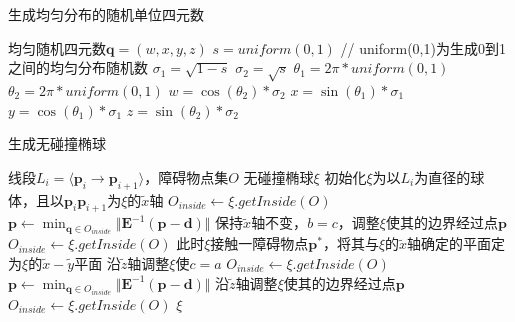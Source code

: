 \documentclass[11pt]{ctexart}
\begin{document}
  
    \begin{algorithm}[H]
		\renewcommand{\thealgorithm}{2-1}
        \caption{生成均匀分布的随机单位四元数}  
        \begin{algorithmic}[1] %
            \Ensure 均匀随机四元数$\mathbf{q}=(w,x,y,z)$
            \STATE $s=uniform(0,1)$ // uniform(0,1)为生成0到1之间的均匀分布随机数
            \STATE $\sigma_{1}=\sqrt{1-s}$
			\STATE $\sigma_{2}=\sqrt{s}$
			\STATE $\theta_{1}=2\pi*uniform(0,1)$
			\STATE $\theta_{2}=2\pi*uniform(0,1)$
			\STATE $w=\cos(\theta_{2})*\sigma_{2}$
			\STATE $x=\sin(\theta_{1})*\sigma_{1}$
			\STATE $y=\cos(\theta_{1})*\sigma_{1}$
			\STATE $z=\sin(\theta_{2})*\sigma_{2}$
			\STATE {}
        \end{algorithmic}  
    \end{algorithm} 

	  \begin{algorithm}[H]
		\renewcommand{\thealgorithm}{2-2}
        \caption{生成无碰撞椭球}  
        \begin{algorithmic}[1] %
            \Require 线段$L_{i}= \langle \mathbf{p}_{i} \rightarrow \mathbf{p}_{i+1} \rangle $，障碍物点集$O$
            \Ensure 无碰撞椭球$\xi$
            \STATE 初始化$\xi$为以$L_{i}$为直径的球体，且以$\mathbf{p}_{i}\mathbf{p}_{i+1}$为$\xi$的$\widetilde{x}$轴
			\STATE  $O_{inside}\gets \xi.getInside(O)$
				\STATE $\mathbf{p}\gets \min_{\mathbf{q} \in O_{inside}}\Vert \mathbf{E}^{-1}(\mathbf{p}-\mathbf{d}) \Vert$
				\STATE 保持$\widetilde{x}$轴不变，$b=c$，调整$\xi$使其的边界经过点$\mathbf{p}$
				\STATE $O_{inside}\gets \xi.getInside(O)$
			\EndWhile
			\STATE 此时$\xi$接触一障碍物点$\mathbf{p}^{*}$，将其与$\xi$的$\widetilde{x}$轴确定的平面定为$\xi$的$\widetilde{x}-\widetilde{y}$平面
			\STATE 沿$\widetilde{z}$轴调整$\xi$使$c=a$
			\STATE  $O_{inside}\gets \xi.getInside(O)$
				\STATE $\mathbf{p}\gets \min_{\mathbf{q} \in O_{inside}}\Vert \mathbf{E}^{-1}(\mathbf{p}-\mathbf{d}) \Vert$
				\STATE 沿$\widetilde{z}$轴调整$\xi$使其的边界经过点$\mathbf{p}$
				\STATE $O_{inside}\gets \xi.getInside(O)$
			\EndWhile
			\STATE \Return $\xi$
        \end{algorithmic}  
    \end{algorithm} 
\end{document}
